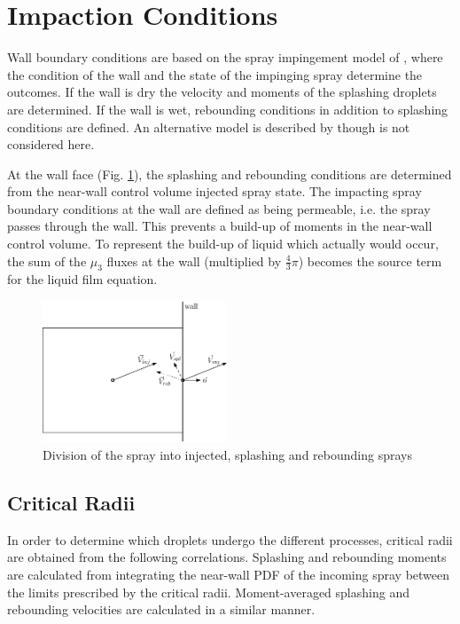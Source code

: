 \documentclass[a4paper,10pt]{article}
\begin{document}
\section{Impaction Conditions} \label{sec:impac_cond}
Wall boundary conditions are based on the spray impingement model of \cite{bai1995}, where the condition of the wall and the state of the impinging spray determine the outcomes. If the wall is dry the velocity and moments of the splashing droplets are determined.  If the wall is wet, rebounding conditions in addition to splashing conditions are defined. An alternative model is described by \cite{grover2001} though is not considered here.

At the wall face (Fig. \ref{fig:wall}), the splashing and rebounding conditions are determined from the near-wall control volume injected spray state. The impacting spray boundary conditions at the wall are defined as being permeable, i.e. the spray passes through the wall. This prevents a build-up of moments in the near-wall control volume. To represent the build-up of liquid which actually would occur, the sum of the $\mu_3$ fluxes at the wall (multiplied by $\frac{4}{3}\pi$) becomes the source term for the liquid film equation.
\begin{figure}[htp]
\centering
\includegraphics[width=0.49\textwidth]{wall.eps}
\caption{Division of the spray into injected, splashing and rebounding sprays}
\label{fig:wall}
\end{figure}



\subsection{Critical Radii}
In order to determine which droplets undergo the different processes, critical radii are obtained from the following correlations. Splashing and rebounding moments are calculated from integrating the near-wall PDF of the incoming spray between the limits prescribed by the critical radii. Moment-averaged splashing and rebounding velocities are calculated in a similar manner.
\end{document}
